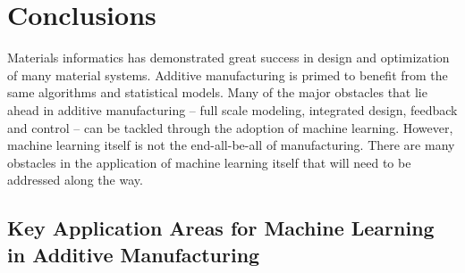 \section{Conclusions}
Materials informatics has demonstrated great success in design and optimization of many material systems. Additive manufacturing is primed to benefit from the same algorithms and statistical models. Many of the major obstacles that lie ahead in additive manufacturing -- full scale modeling, integrated design, feedback and control -- can be tackled through the adoption of machine learning. However, machine learning itself is not the end-all-be-all of manufacturing. There are many obstacles in the application of machine learning itself that will need to be addressed along the way.

\subsection{Key Application Areas for Machine Learning in Additive Manufacturing}
